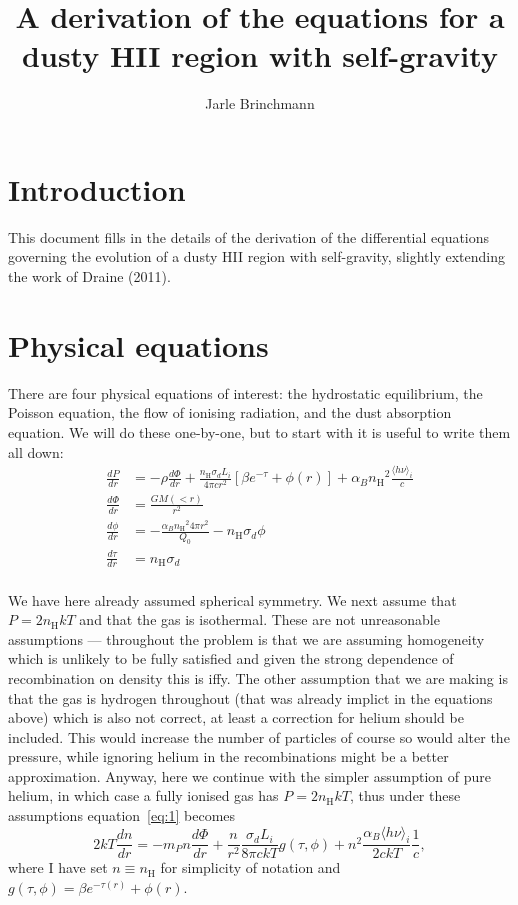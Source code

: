 \documentclass[11pt]{article}
\newcommand{\ddr}[1]{\frac{d#1}{dr}}
\newcommand{\nH}{\ensuremath{n_{\mathrm{H}}}}
\newcommand{\hnui}{\ensuremath{\langle h\nu\rangle_i}}
\begin{document}
\title{A derivation of the equations for a dusty HII region with self-gravity}
\author{Jarle Brinchmann}
\maketitle

\section{Introduction}
\label{sec:introduction}

This document fills in the details of the derivation of the differential equations governing the evolution of a dusty HII region with self-gravity, slightly extending the work of Draine (2011).

\section{Physical equations}
\label{sec:physical-equations}

There are four physical equations of interest: the hydrostatic equilibrium, the Poisson equation, the flow of ionising radiation, and the dust absorption equation. We will do these one-by-one, but to start with it is useful to write them all down:
\begin{align}
  \label{eq:1}
  \ddr{P} & =-\rho\ddr{\Phi}+\frac{\nH \sigma_d L_i}{4\pi c r^2} \left[\beta e^{-\tau} + \phi(r)\right]+ \alpha_B \nH^2 \frac{\hnui}{c}\\ \label{eq:2}
\ddr{\Phi} & = \frac{G M(<r)}{r^2} \\  
  \ddr{\phi} & = -\frac{\alpha_B \nH^2 4\pi r^2}{Q_0} - \nH\sigma_d\phi \\
  \ddr{\tau} & = \nH \sigma_d\\
\end{align}

We have here already assumed spherical symmetry. We next assume that $P=2\nH kT$ and that the gas is isothermal. These are not unreasonable assumptions --- throughout the problem is that we are assuming homogeneity which is unlikely to be fully satisfied and given the strong dependence of recombination on density this is iffy. The other assumption that we are making is that the gas is hydrogen throughout (that was already implict in the equations above) which is also not correct, at least a correction for helium should be included. This would increase the number of particles of course so would alter the pressure, while ignoring helium in the recombinations might be a better approximation. Anyway, here we continue with the simpler assumption of pure helium, in which case a fully ionised gas has $P=2\nH kT$, thus under these assumptions equation~\eqref{eq:1}  becomes
\begin{equation}
  \label{eq:3}
  2kT\ddr{n} = -m_P n \ddr{\Phi}+\frac{n}{r^2} \frac{\sigma_d L_i}{8\pi c kT} g(\tau,\phi) + n^2\frac{\alpha_B \hnui}{2ckT}\frac{1}{c},
\end{equation}
where I have set $n\equiv\nH$ for simplicity of notation and $g(\tau, \phi)=\beta e^{-\tau(r)}+\phi(r)$.
\end{document}
